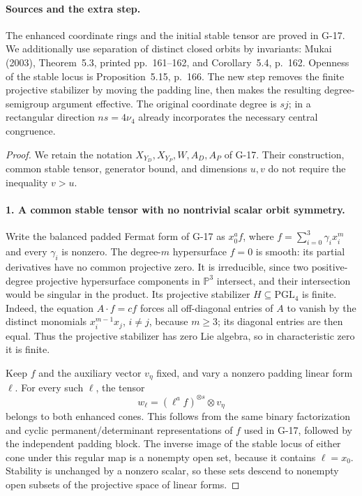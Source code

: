\paragraph{Sources and the extra step.}
The enhanced coordinate rings and the initial stable tensor are
proved in G-17. We additionally use separation of distinct closed
orbits by invariants: Mukai (2003), Theorem~5.3, printed pp.~161--162,
and Corollary~5.4, p.~162. Openness of the stable locus is
Proposition~5.15, p.~166. The new step removes the finite projective
stabilizer by moving the padding line, then makes the resulting
degree-semigroup argument effective. The original coordinate degree
is $sj$; in a rectangular direction $ns=4\nu_4$ already incorporates
the necessary central congruence.

\begin{proof}
We retain the notation $X_{Y_D},X_{Y_P},W,A_D,A_P$ of G-17.
Their construction, common stable tensor, generator bound, and
dimensions $u,v$ do not require the inequality $v>u$.

\paragraph{1. A common stable tensor with no nontrivial scalar orbit symmetry.}
Write the balanced padded Fermat form of G-17 as $x_0^a f$, where
$f=\sum_{i=0}^3\gamma_i x_i^m$ and every $\gamma_i$ is nonzero.
The degree-$m$ hypersurface $f=0$ is smooth: its partial derivatives
have no common projective zero. It is irreducible, since two
positive-degree projective hypersurface components in $\mathbb P^3$
intersect, and their intersection would be singular in the product.
Its projective stabilizer $H\subseteq\mathrm{PGL}_4$ is finite.
Indeed, the equation $A\cdot f=cf$ forces all off-diagonal entries
of $A$ to vanish by the distinct monomials $x_i^{m-1}x_j$,
$i\ne j$, because $m\geq3$; its diagonal entries are then equal.
Thus the projective stabilizer has zero Lie algebra, so in
characteristic zero it is finite.

Keep $f$ and the auxiliary vector $v_\eta$ fixed, and vary a nonzero
padding linear form $\ell$. For every such $\ell$, the tensor
\[
 w_\ell=(\ell^a f)^{\otimes s}\otimes v_\eta
\]
belongs to both enhanced cones. This follows from the same binary
factorization and cyclic permanent/determinant representations of
$f$ used in G-17, followed by the independent padding block.
The inverse image of the stable locus of either cone under this
regular map is a nonempty open set, because it contains $\ell=x_0$.
Stability is unchanged by a nonzero scalar, so these sets descend
to nonempty open subsets of the projective space of linear forms.


\end{proof}
